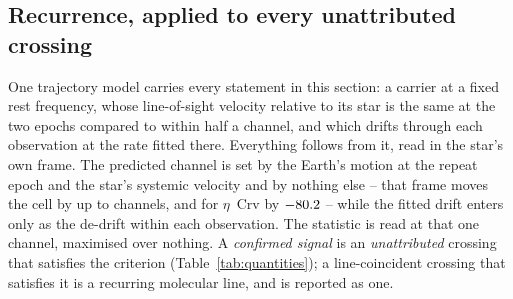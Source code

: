 \subsection{Recurrence, applied to every unattributed crossing}
\label{sec:etacrv}

One trajectory model carries every statement in this section: a carrier at a
fixed rest frequency, whose line-of-sight velocity relative to its star is the
same at the two epochs compared to within half a channel, and which drifts
through each observation at the rate fitted there. Everything follows from it,
read in the star's own frame. The predicted channel is set by the Earth's
motion at the repeat epoch and the star's systemic velocity and by nothing
else -- that frame moves the cell by up to \ZtFrameChanMax{} channels, and
for $\eta$~Crv by $-80.2$ -- while the fitted drift enters only as the
de-drift within each observation. The statistic is read at that one channel,
maximised over nothing. A
\emph{confirmed signal} is an \emph{unattributed} crossing that satisfies the
criterion (Table~\ref{tab:quantities}); a line-coincident crossing that
satisfies it is a recurring molecular line, and is reported as one.


